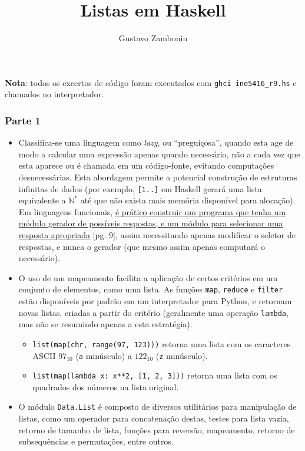 \documentclass{../sftex/sftex}
\title{Listas em Haskell}
\author{Gustavo Zambonin}
\begin{document}
\maketitle

\textbf{Nota}: todos os excertos de código foram executados com
\verb!ghci ine5416_r9.hs! e chamados no interpretador.

\subsubsection*{Parte 1}
\begin{itemize}
    \item Classifica-se uma linguagem como \emph{lazy}, ou ``preguiçosa'',
    quando esta age de modo a calcular uma expressão apenas quando necessário,
    não a cada vez que esta aparece ou é chamada em um código-fonte, evitando
    computações desnecessárias. Esta abordagem permite a potencial construção
    de estruturas infinitas de dados (por exemplo, \verb![1..]! em Haskell
    gerará uma lista equivalente a $\mathbb{N^{*}}$ até que não exista mais
    memória disponível para alocação). Em linguagens funcionais,
    \href{http://www.cs.kent.ac.uk/people/staff/dat/miranda/whyfp90.pdf}
    {é prático construir um programa que tenha um módulo gerador de possíveis
    respostas, e um módulo para selecionar uma resposta apropriada} [pg. 9],
    assim necessitando apenas modificar o seletor de respostas, e nunca o
    gerador (que mesmo assim apenas computará o necessário).

    \item O uso de um mapeamento facilita a aplicação de certos critérios em
    um conjunto de elementos, como uma lista. As funções \verb!map!,
    \verb!reduce! e \verb!filter! estão disponíveis por padrão em um
    interpretador para Python, e retornam novas listas, criadas a partir do
    critério (geralmente uma operação \verb!lambda!, mas não se resumindo
    apenas a esta estratégia).

    \begin{itemize}
        \item \verb!list(map(chr, range(97, 123)))! retorna uma lista com os
        caracteres ASCII $97_{10}$ (\verb!a! minúsculo) a $122_{10}$
        (\verb!z! minúsculo).

        \item \verb!list(map(lambda x: x**2, [1, 2, 3]))! retorna uma lista
        com os quadrados dos números na lista original.
    \end{itemize}

    \item O módulo \verb!Data.List! é composto de diversos utilitários para
    manipulação de listas, como um operador para concatenação destas, testes
    para lista vazia, retorno de tamanho de lista, funções para reversão,
    mapeamento, retorno de subsequências e permutações, entre outros.

\end{itemize}
\end{document}
